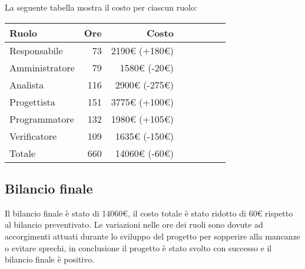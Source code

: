 La seguente tabella mostra il costo per ciascun ruolo:
\begin{table}[H]
    \begin{tabularx}{\linewidth}{X|rrrrrrr}
    \rowcolor{gray!30}Ruolo & Ore & Costo \\
    \hline
    Responsabile                            & 73     & 2190€ (+180€)\\
    \rowcolor{gray!10}Amministratore        & 79     & 1580€ (-20€)\\
    Analista                                & 116    & 2900€ (-275€)\\
    \rowcolor{gray!10}Progettista           & 151    & 3775€ (+100€) \\
    Programmatore                           & 132    & 1980€ (+105€) \\
    \rowcolor{gray!10}Verificatore          & 109    & 1635€ (-150€)\\
    \hline Totale                           & 660    & 14060€ (-60€) \\ 
    \end{tabularx}
\end{table}


\subsection{Bilancio finale}

Il bilancio finale è stato di 14060€, il costo totale è stato ridotto di 60€ rispetto al bilancio preventivato. Le variazioni nelle ore dei ruoli sono dovute ad accorgimenti attuati durante lo sviluppo del progetto per sopperire alla mancanze o evitare sprechi, in conclusione il progetto è stato svolto con successo e il bilancio finale è positivo.